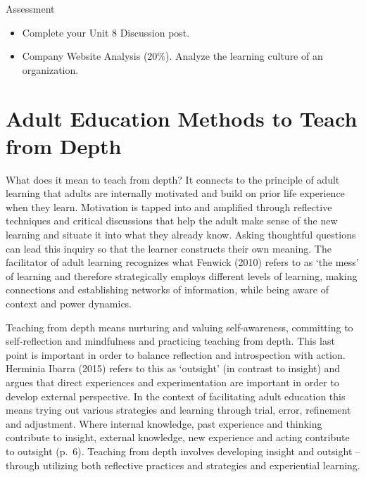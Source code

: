 \documentclass[
]{book}
\providecommand{\tightlist}{%
  \setlength{\itemsep}{0pt}\setlength{\parskip}{0pt}}
\begin{document}
\begin{assessment}
{Assessment}

\begin{itemize}
\tightlist
\item
  Complete your Unit 8 Discussion post.\\
\item
  Company Website Analysis (20\%). Analyze the learning culture of an organization.
\end{itemize}
\end{assessment}

\hypertarget{adult-education-methods-to-teach-from-depth}{%
\section{Adult Education Methods to Teach from Depth}\label{adult-education-methods-to-teach-from-depth}}

What does it mean to teach from depth? It connects to the principle of
adult learning that adults are internally motivated and build on prior
life experience when they learn. Motivation is tapped into and amplified
through reflective techniques and critical discussions that help the
adult make sense of the new learning and situate it into what they
already know. Asking thoughtful questions can lead this inquiry so that
the learner constructs their own meaning. The facilitator of adult
learning recognizes what Fenwick (2010) refers to as `the mess' of
learning and therefore strategically employs different levels of
learning, making connections and establishing networks of information,
while being aware of context and power dynamics.

Teaching from depth means nurturing and valuing self-awareness,
committing to self-reflection and mindfulness and practicing teaching
from depth. This last point is important in order to balance reflection
and introspection with action. Herminia Ibarra (2015) refers to this as
`outsight' (in contrast to insight) and argues that direct experiences
and experimentation are important in order to develop external
perspective. In the context of facilitating adult education this means
trying out various strategies and learning through trial, error,
refinement and adjustment. Where internal knowledge, past experience and
thinking contribute to insight, external knowledge, new experience and
acting contribute to outsight (p.~6). Teaching from depth involves
developing insight and outsight -- through utilizing both reflective
practices and strategies and experiential learning.
\end{document}

